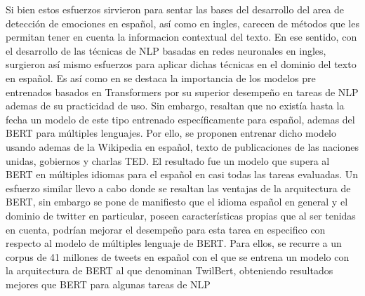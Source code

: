 Si bien estos esfuerzos sirvieron para sentar las bases del desarrollo del area de detección de emociones en español, así como en ingles, carecen de métodos que les permitan tener en cuenta la informacion contextual del texto. En ese sentido, con el desarrollo de las técnicas de NLP basadas en redes neuronales en ingles, surgieron así mismo esfuerzos para aplicar dichas técnicas en el dominio del texto en español. Es así como en \cite{canete2020spanish} se destaca la importancia de los modelos pre entrenados basados en Transformers por su superior desempeño en tareas de NLP ademas de su practicidad de uso. Sin embargo, resaltan que no existía hasta la fecha un modelo de este tipo entrenado específicamente para español, ademas del BERT para múltiples lenguajes. Por ello, se proponen entrenar dicho modelo usando ademas de la Wikipedia en español, texto de publicaciones de las naciones unidas, gobiernos y charlas TED. El resultado fue un modelo que supera al BERT en múltiples idiomas para el español en casi todas las tareas evaluadas. Un esfuerzo similar llevo a cabo \cite{gonzalez2021twilbert} donde se resaltan las ventajas de la arquitectura de BERT, sin embargo se pone de manifiesto que el idioma español en general y el dominio de twitter en particular, poseen características propias que al ser tenidas en cuenta, podrían mejorar el desempeño para esta tarea en especifico con respecto al modelo de múltiples lenguaje de BERT. Para ellos, se recurre a un corpus de 41 millones de tweets en español con el que se entrena un modelo con la arquitectura de BERT al que denominan TwilBert, obteniendo resultados mejores que BERT para algunas tareas de NLP







